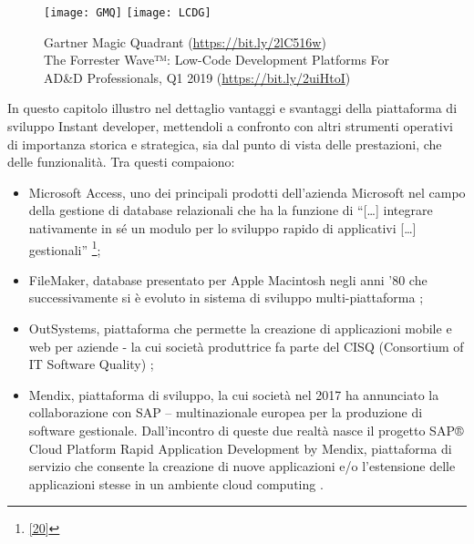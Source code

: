 \begin{figure}[!h] 
	\centering  
	\texttt{[image: GMQ]}
	\texttt{[image: LCDG]}
	\caption{Gartner Magic Quadrant (\url{https://bit.ly/2lC516w})\\ 
		The Forrester Wave™: Low-Code Development Platforms For AD\&D Professionals, Q1 2019  (\url{https://bit.ly/2uiHtoI})}
	\label{Graphic}
\end{figure}

In questo capitolo illustro nel dettaglio vantaggi e svantaggi della piattaforma di sviluppo Instant developer, mettendoli a confronto con altri strumenti operativi di importanza storica e strategica, sia dal punto di vista delle prestazioni, che delle funzionalità. Tra questi compaiono: 
\begin{itemize}
	\item Microsoft Access, uno dei principali prodotti dell'azienda Microsoft nel campo della gestione di database relazionali che ha la funzione di “[…] integrare nativamente in sé un modulo per lo sviluppo rapido di applicativi […] gestionali” \footnote[5]{\hyperref[bib20]{[20]}};
	
	\item FileMaker, database presentato per Apple Macintosh negli anni '80 che successivamente si è evoluto in sistema di sviluppo multi-piattaforma \hyperref[bib21]{\cite{[21]}} ;
	
	\item OutSystems, piattaforma che permette la creazione di applicazioni mobile e web per aziende - la cui società produttrice fa parte del CISQ (Consortium of IT Software Quality) \hyperref[bib22]{\cite{[22]}}; 
	
	\item Mendix, piattaforma di sviluppo, la cui società nel 2017 ha annunciato la collaborazione con SAP – multinazionale europea per la produzione di software gestionale. Dall'incontro di queste due realtà nasce il progetto SAP® Cloud Platform Rapid Application Development by Mendix, piattaforma di servizio che consente la creazione di nuove applicazioni e/o l'estensione delle applicazioni stesse in un ambiente cloud computing \hyperref[bib23]{\cite{[23]}}.
\end{itemize}

